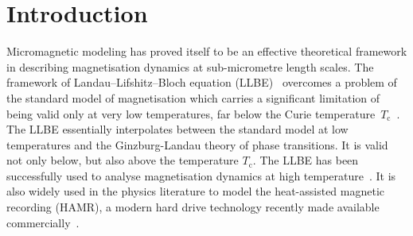 \documentclass[11pt,reqno]{amsart}
\theoremstyle{definition}
\numberwithin{equation}{section}
\begin{document}
\section{Introduction}
Micromagnetic modeling has proved itself to be an effective theoretical framework in describing magnetisation dynamics at sub-micrometre length scales.
The framework of Landau--Lifshitz--Bloch equation
(LLBE)~\citep{Gar91,Gar97} overcomes
a problem of the standard model of magnetisation which carries a significant
limitation of being valid only at very low temperatures,
far below the Curie temperature~$T_{\text{c}}$~\citep{ChuNie20}. 
The LLBE essentially interpolates between the standard model at low temperatures and 
the Ginzburg-Landau theory of phase transitions.
It is valid not only below, but also above the temperature $T_{\text{c}}$. The LLBE has been successfully used to analyse magnetisation dynamics at high temperature~\citep{AtxHinNow16, ChuNie20, ChuNowChaGar06, NieChu16}. It is also widely used in the physics literature to model the heat-assisted magnetic recording (HAMR), a modern hard drive technology recently made available commercially~\citep{MeoPan20, ZhuLi13}.
\end{document}
